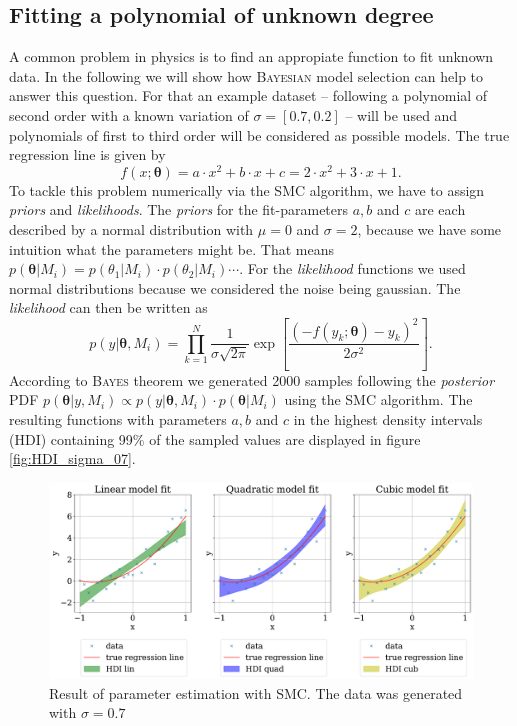 \documentclass[%
 reprint,
 amsmath,amssymb,
 aps,
]{revtex4-1}
\newcommand{\btheta}{\boldsymbol{\theta}}
\begin{document}
\subsection{Fitting a polynomial of unknown degree}
\noindent A common problem in physics is to find an appropiate function to fit unknown data. In the following we will show how \textsc{Bayesian} model selection can help to answer this question. For that an example dataset -- following a polynomial of second order with a known variation of $\sigma=[0.7, 0.2]$ -- will be used and polynomials of first to third order will be considered as possible models. 
The true regression line is given by
\begin{equation*}
	f(x;\btheta)=a\cdot x^2+b\cdot x+c=2\cdot x^2+3\cdot x+1.
\end{equation*}
To tackle this problem numerically via the SMC algorithm, we have to assign \emph{priors} and \emph{likelihoods}. The \emph{priors} for the fit-parameters $a,b$ and $c$  are each described by a normal distribution with $\mu=0$ and $\sigma=2$, because we have some intuition what the parameters might be. That means $p(\btheta|M_i)=p(\theta_1|M_i)\cdot p(\theta_2|M_i)\cdots $. For the \emph{likelihood} functions we used normal distributions because we considered the noise being gaussian. The \emph{likelihood} can then be written as \cite[Chap. 3]{sivia}
$$p(y|\btheta, M_i)=\prod_{k=1}^{N}\frac{1}{\sigma\sqrt{2\pi}}\exp{\left[\frac{(-f(y_k;\btheta)-y_k)^2}{2\sigma^2}\right]}.$$
According to \textsc{Bayes} theorem we generated 2000 samples following the \emph{posterior} PDF $p(\btheta|y,M_i)\propto p(y|\btheta, M_i)\cdot p(\btheta|M_i) $ using the SMC algorithm. The resulting functions with parameters $a,b$ and $c$ in the highest density intervals (HDI) containing 99\% of the sampled values are displayed in figure \eqref{fig:HDI_sigma_07}.
\begin{figure}[htbp]
		\includegraphics[width=\textwidth]{HDI_sigma_07}
	\caption{Result of parameter estimation with SMC. The data was generated with $\sigma=0.7$}\label{fig:HDI_sigma_07}
\end{figure}
\end{document}
